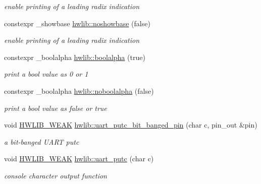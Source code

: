 \begin{DoxyCompactItemize}
\begin{DoxyCompactList}\small\item\em enable printing of a leading radix indication \end{DoxyCompactList}\item 
constexpr \+\_\+showbase \hyperlink{namespacehwlib_af813ae25dc70ae85e2f06dcf81f8963b}{hwlib\+::noshowbase} (false)
\begin{DoxyCompactList}\small\item\em enable printing of a leading radix indication \end{DoxyCompactList}\item 
constexpr \+\_\+boolalpha \hyperlink{namespacehwlib_a499e8cd6806e66c4c425b64c9512a21c}{hwlib\+::boolalpha} (true)
\begin{DoxyCompactList}\small\item\em print a bool value as \textquotesingle{}0\textquotesingle{} or \textquotesingle{}1\textquotesingle{} \end{DoxyCompactList}\item 
constexpr \+\_\+boolalpha \hyperlink{namespacehwlib_a6fe77cc67d9850cb262eb6e15e37724d}{hwlib\+::noboolalpha} (false)
\begin{DoxyCompactList}\small\item\em print a bool value as \textquotesingle{}false\textquotesingle{} or \textquotesingle{}true\textquotesingle{} \end{DoxyCompactList}\item 
void \hyperlink{hwlib-defines_8hpp_a04be4340016df60d6636c1d1c6d94fc9}{H\+W\+L\+I\+B\+\_\+\+W\+E\+AK} \hyperlink{namespacehwlib_a10ed5b50cabfea49044e22331ac6f284}{hwlib\+::uart\+\_\+putc\+\_\+bit\+\_\+banged\+\_\+pin} (char c, pin\+\_\+out \&pin)
\begin{DoxyCompactList}\small\item\em a bit-\/banged U\+A\+RT putc \end{DoxyCompactList}\item 
void \hyperlink{hwlib-defines_8hpp_a04be4340016df60d6636c1d1c6d94fc9}{H\+W\+L\+I\+B\+\_\+\+W\+E\+AK} \hyperlink{namespacehwlib_ae568ebef4b8d8a77cecae8cea595896f}{hwlib\+::uart\+\_\+putc} (char c)
\begin{DoxyCompactList}\small\item\em console character output function \end{DoxyCompactList}\end{DoxyCompactItemize}
